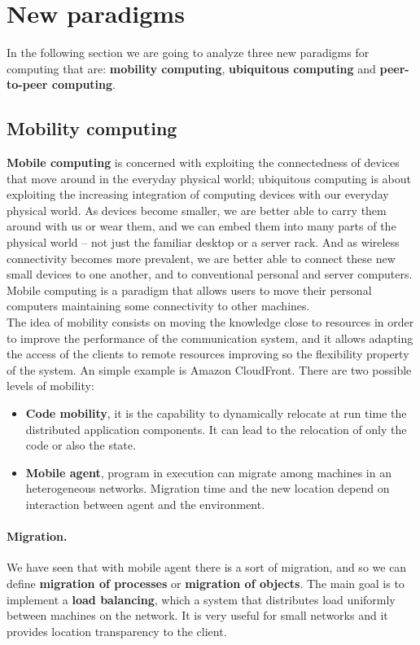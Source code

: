 \section{New paradigms}
In the following section we are going to analyze three new paradigms for computing that are: \textbf{mobility computing}, \textbf{ubiquitous computing} and\textbf{ peer-to-peer computing}.

\subsection{Mobility computing}
\textbf{Mobile computing} is concerned with exploiting the connectedness of devices that move around in the everyday physical world; ubiquitous computing is about exploiting the increasing integration of computing devices with our everyday physical world. As devices become smaller, we are better able to carry them around with us or wear them, and we can embed them into many parts of the physical world – not just the familiar desktop or a server rack. And as wireless connectivity becomes more prevalent, we are better able to connect these new small devices to one another, and to conventional personal and server computers. Mobile computing is a paradigm that allows users to move their personal computers maintaining some connectivity to other machines. \\
The idea of mobility consists on moving the knowledge close to resources in order to improve the performance of the communication system, and it allows adapting the access of the clients to remote resources improving so the flexibility property of the system. An simple example is Amazon CloudFront. There are two possible levels of mobility:
\begin{itemize}
	\item \textbf{Code mobility}, it is the capability to dynamically relocate at run time the distributed application components. It can lead to the relocation of only the code or also the state.
	\item \textbf{Mobile agent}, program in execution can  migrate among machines in an heterogeneous networks. Migration time and the new location depend on interaction between agent and the environment.
\end{itemize}

\paragraph*{Migration.} We have seen that with mobile agent there is a sort of migration, and so we can define \textbf{migration of processes} or \textbf{migration of objects}.
The main goal is to implement a \textbf{load balancing}, which a system that distributes load uniformly between machines on the network. It is very useful for small networks and it provides location transparency to the client.

